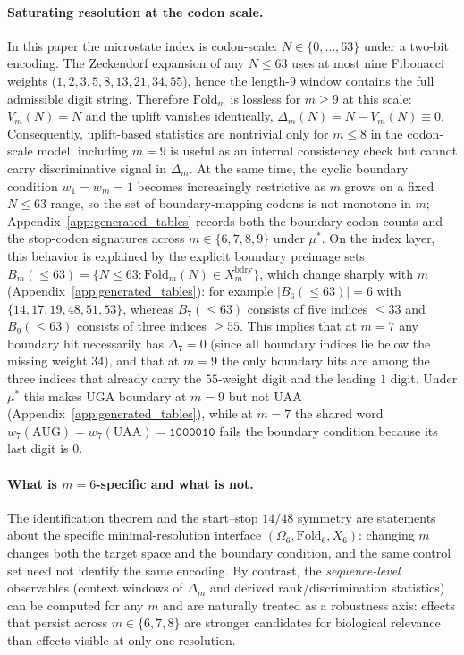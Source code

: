 \paragraph{Saturating resolution at the codon scale.}
In this paper the microstate index is codon-scale: $N\in\{0,\dots,63\}$ under a two-bit encoding.
The Zeckendorf expansion of any $N\le 63$ uses at most nine Fibonacci weights ($1,2,3,5,8,13,21,34,55$), hence the length-$9$ window contains the full admissible digit string.
Therefore $\mathrm{Fold}_m$ is lossless for $m\ge 9$ at this scale: $V_m(N)=N$ and the uplift vanishes identically, $\Delta_m(N)=N-V_m(N)\equiv 0$.
Consequently, uplift-based statistics are nontrivial only for $m\le 8$ in the codon-scale model; including $m=9$ is useful as an internal consistency check but cannot carry discriminative signal in $\Delta_m$.
At the same time, the cyclic boundary condition $w_1=w_m=1$ becomes increasingly restrictive as $m$ grows on a fixed $N\le 63$ range, so the set of boundary-mapping codons is not monotone in $m$; Appendix~\ref{app:generated_tables} records both the boundary-codon counts and the stop-codon signatures across $m\in\{6,7,8,9\}$ under $\mu^\ast$.
On the index layer, this behavior is explained by the explicit boundary preimage sets $B_m(\le 63)=\{N\le 63:\mathrm{Fold}_m(N)\in X_m^{\mathrm{bdry}}\}$, which change sharply with $m$ (Appendix~\ref{app:generated_tables}): for example $|B_6(\le 63)|=6$ with $\{14,17,19,48,51,53\}$, whereas $B_7(\le 63)$ consists of five indices $\le 33$ and $B_9(\le 63)$ consists of three indices $\ge 55$.
This implies that at $m=7$ any boundary hit necessarily has $\Delta_7=0$ (since all boundary indices lie below the missing weight $34$), and that at $m=9$ the only boundary hits are among the three indices that already carry the $55$-weight digit and the leading $1$ digit.
Under $\mu^\ast$ this makes $\mathrm{UGA}$ boundary at $m=9$ but not $\mathrm{UAA}$ (Appendix~\ref{app:generated_tables}), while at $m=7$ the shared word $w_7(\mathrm{AUG})=w_7(\mathrm{UAA})=\texttt{1000010}$ fails the boundary condition because its last digit is $0$.

\paragraph{What is $m=6$-specific and what is not.}
The identification theorem and the start--stop $14/48$ symmetry are statements about the specific minimal-resolution interface $(\Omega_6,\mathrm{Fold}_6,X_6)$: changing $m$ changes both the target space and the boundary condition, and the same control set need not identify the same encoding.
By contrast, the \emph{sequence-level} observables (context windows of $\Delta_m$ and derived rank/discrimination statistics) can be computed for any $m$ and are naturally treated as a robustness axis: effects that persist across $m\in\{6,7,8\}$ are stronger candidates for biological relevance than effects visible at only one resolution.

